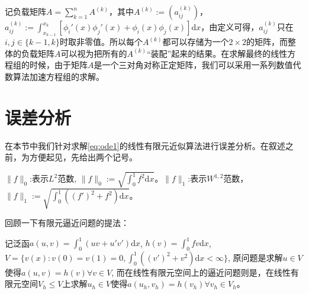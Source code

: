 \documentclass[lang=cn,10pt,newtx]{elegantbook}
\newcommand{\dif}{\mathrm{d}}
\newcommand{\norm}[1]{\|#1\|}
\begin{document}
记负载矩阵$A=\sum_{k=1}^{n}A^{(k)}$，其中$A^{(k)}:=(a_{ij}^{(k)})$，$a_{ij}^{(k)}:=\int_{x_{k-1}}^{x_{k}}[\phi_{i}'(x)\phi_{j}'(x)+\phi_{i}(x)\phi_{j}(x)]\dif x$，由定义可得，$a_{ij}^{(k)}$只在$i,j\in\{k-1,k\}$时取非零值。所以每个$A^{(k)}$都可以存储为一个$2\times 2$的矩阵，而整体的负载矩阵$A$可以视为把所有的$A^{(k)}$“装配”起来的结果。在求解最终的线性方程组的时候，由于矩阵$A$是一个三对角对称正定矩阵，我们可以采用一系列数值代数算法加速方程组的求解。
\section{误差分析}
在本节中我们针对求解\eqref{eq:ode1}的线性有限元近似算法进行误差分析。在叙述之前，为方便起见，先给出两个记号。

\begin{remark}
  $\norm{f}_{0}$:表示$L^{2}$范数, $\norm{f}_{0}:=\sqrt{\int_{0}^{1}f^{2}\dif x}$。$\norm{f}_{1}$:表示$W^{1,2}$范数，$\norm{f}_{1}:=\sqrt{\int_{0}^{1}((f')^{2}+f^{2})\dif x}$。
\end{remark}

回顾一下有限元逼近问题的提法：
\begin{example}
  \label{prob:FE problem}
记泛函$a(u,v)=\int_{0}^{1}(uv+u'v')\dif x$, $h(v)=\int_{0}^{1}fv\dif x$, $V=\{v(x):v(0)=v(1)=0,\int_{0}^{1}((v')^{2}+v^2)\dif x<\infty\}$, 原问题是求解$u\in V$使得$a(u,v)=h(v)\forall v\in V$, 而在线性有限元空间上的逼近问题则是，在线性有限元空间$V_{h}\le V$上求解$u_{h}\in V$使得$a(u_{h},v_{h})=h(v_{h})\forall v_{h}\in V_{h}$。
\end{example}
\end{document}
